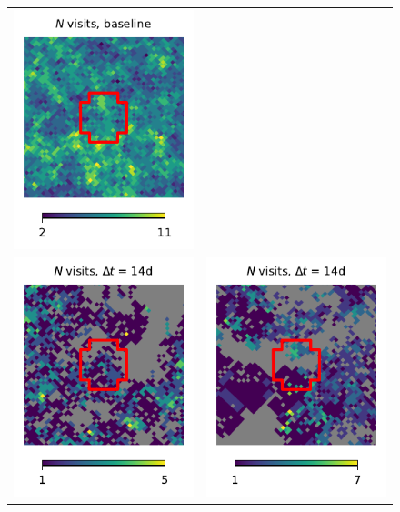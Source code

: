 \documentclass[preprintm,linenumbers]{aastex631}
\begin{document}
\begin{figure}
\begin{tabular}{@{}c@{}c@{}}
				\includegraphics{results/skymaps_cutout/skymaps_cutout_first_year_one_snap_v4_0_10yrs_db_noDD_noTwi_nside-256_CountMetric_g_WFD_noDD_noTwi.pdf} \\
				\includegraphics{results/skymaps_cutout/skymaps_cutout_first_year_one_snap_v4_0_10yrs_db_noDD_noTwi_tscale-14_nside-256_doAllTemplateMetrics_reduceCount_g_NES_noDD_noTwi.pdf} &
				\includegraphics{results/skymaps_cutout/skymaps_cutout_first_year_one_snap_v4_0_10yrs_db_noDD_noTwi_tscale-14_nside-256_doAllTemplateMetrics_reduceCount_g_WFD_noDD_noTwi.pdf} \\

\end{tabular}
\end{figure}
\end{document}
